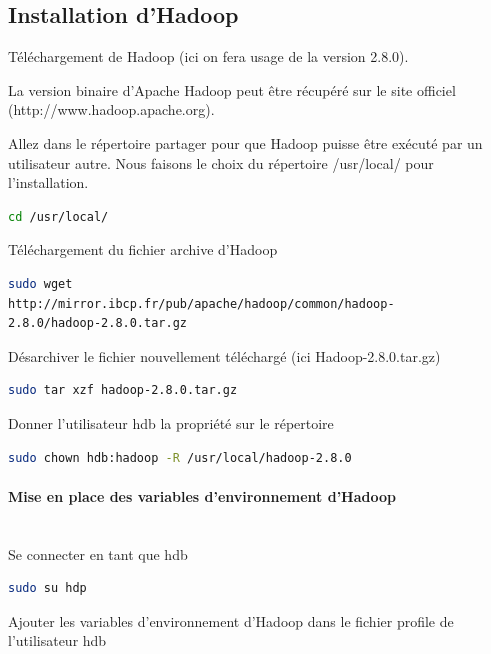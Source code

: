 \documentclass[12pt,french]{book}
\begin{document}
\subsection{Installation d'Hadoop}

Téléchargement de Hadoop (ici on fera usage de la version 2.8.0).

La version binaire d’Apache Hadoop peut être récupéré sur le site officiel (http://www.hadoop.apache.org).

Allez dans le répertoire partager pour que Hadoop puisse être exécuté par un utilisateur autre.  Nous faisons le choix du répertoire /usr/local/ pour l’installation.


\begin{lstlisting}[language=bash, frame=single]
cd /usr/local/
\end{lstlisting}

Téléchargement du fichier archive d’Hadoop

\begin{lstlisting}[language=bash, frame=single]
sudo wget 
http://mirror.ibcp.fr/pub/apache/hadoop/common/hadoop-
2.8.0/hadoop-2.8.0.tar.gz
\end{lstlisting}

Désarchiver le fichier nouvellement téléchargé (ici Hadoop-2.8.0.tar.gz)

\begin{lstlisting}[language=bash, frame=single]
sudo tar xzf hadoop-2.8.0.tar.gz
\end{lstlisting}

Donner l’utilisateur hdb la propriété sur le répertoire

\begin{lstlisting}[language=bash, frame=single]
sudo chown hdb:hadoop -R /usr/local/hadoop-2.8.0
\end{lstlisting}

\paragraph{Mise en place des variables d’environnement d’Hadoop}\mbox{}\\


Se connecter en tant que hdb

\begin{lstlisting}[language=bash, frame=single]
sudo su hdp
\end{lstlisting}

Ajouter les variables d’environnement d’Hadoop dans le fichier profile de l’utilisateur hdb
\end{document}
